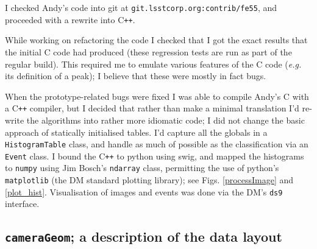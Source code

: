 \documentclass[12pt]{article}
\newcommand{\CPP}{C\texttt{++}\xspace}  %
\begin{document}
 I checked Andy's code into git at \texttt{git\@git.lsstcorp.org:contrib/fe55}, and proceeded
with a rewrite into \CPP.

While working on refactoring the code I checked that I got the exact results that the initial C code had
produced (these regression tests are run as part of the regular build).  This required me to emulate various
features of the C code (\textit{e.g.} its definition of a peak); I believe that these were mostly in fact
bugs.

When the prototype-related bugs were fixed I was able to compile Andy's C with a \CPP compiler, but I decided
that rather than make a minimal translation I'd re-write the algorithms into rather more idiomatic code;
I did not change the basic approach of statically initialised tables.  I'd
capture all the globals in a \texttt{HistogramTable} class, and handle as much of possible as the
classification via an \texttt{Event} class.  I bound the \CPP to python using swig, and mapped the histograms
to \texttt{numpy} using Jim Bosch's \texttt{ndarray} class, permitting the use of python's \texttt{matplotlib}
(the DM standard plotting library); see Figs. \ref{processImage} and \ref{plot_hist}.  Visualisation of images
and events was done via the DM's \texttt{ds9} interface.

\subsection{\texttt{cameraGeom}; a description of the data layout}
\end{document}
